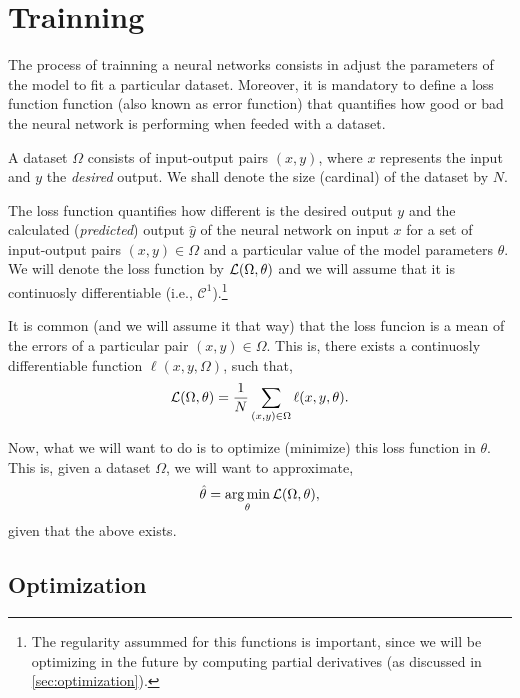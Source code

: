 \section{Trainning}

The process of trainning a neural networks consists in adjust the parameters of
the model to fit a particular dataset. Moreover, it is mandatory to define a
loss function function (also known as error function) that quantifies how good
or bad the neural network is performing when feeded with a dataset.

A dataset \(\Omega\) consists of input-output pairs \((x, y)\), where \(x\)
represents the input and \(y\) the \emph{desired} output. We shall denote the
size (cardinal) of the dataset by \(N\).

The loss function quantifies how different is the desired output \(y\) and the
calculated (\emph{predicted}) output \(\hat{y}\) of the neural network on input
\(x\) for a set of input-output pairs \((x , y) \in \Omega\) and a particular
value of the model parameters \(\theta\). We will denote the loss function by
\(\mathcal{L} (\Omega, \theta)\) and we will assume that it is continuosly
differentiable (i.e., \(\mathcal{C}^1\)).\footnote{The regularity assummed for
  this functions is important, since we will be optimizing in the future by
  computing partial derivatives (as discussed in \vref{sec:optimization}).}

It is common (and we will assume it that way) that the loss funcion is a mean
of the errors of a particular pair \((x, y) \in \Omega\). This is, there exists
a continuosly differentiable function \(\ell (x, y, \Omega)\), such that,
\begin{equation} \label{eq:loss}
  \mathcal{L}(\Omega, \theta) =
  \frac{1}{N} \sum_{(x, y) \in \Omega} \ell (x, y, \theta).
\end{equation}

Now, what we will want to do is to optimize (minimize) this loss function in
\(\theta\). This is, given a dataset \(\Omega\), we will want to approximate,
\begin{equation}
  \hat{\theta} = \operatorname*{arg\,min}_{\theta} \mathcal{L}(\Omega, \theta),
\end{equation}
given that the above exists.

\subsection{Optimization}\label{sec:optimization}

